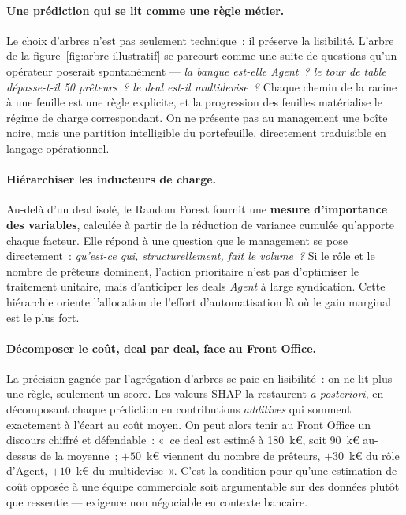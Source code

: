 \medskip
\paragraph{Une prédiction qui se lit comme une règle métier.}
Le choix d'arbres n'est pas seulement technique~: il préserve la lisibilité. L'arbre de la figure~\ref{fig:arbre-illustratif} se parcourt comme une suite de questions qu'un opérateur poserait spontanément --- \textit{la banque est-elle Agent~? le tour de table dépasse-t-il 50 prêteurs~? le deal est-il multidevise~?} Chaque chemin de la racine à une feuille est une règle explicite, et la progression des feuilles matérialise le régime de charge correspondant. On ne présente pas au management une boîte noire, mais une partition intelligible du portefeuille, directement traduisible en langage opérationnel.

\medskip
\paragraph{Hiérarchiser les inducteurs de charge.}
Au-delà d'un deal isolé, le Random Forest fournit une \textbf{mesure d'importance des variables}, calculée à partir de la réduction de variance cumulée qu'apporte chaque facteur. Elle répond à une question que le management se pose directement~: \emph{qu'est-ce qui, structurellement, fait le volume~?} Si le rôle et le nombre de prêteurs dominent, l'action prioritaire n'est pas d'optimiser le traitement unitaire, mais d'anticiper les deals \textit{Agent} à large syndication. Cette hiérarchie oriente l'allocation de l'effort d'automatisation là où le gain marginal est le plus fort.

\medskip
\paragraph{Décomposer le coût, deal par deal, face au Front Office.}
La précision gagnée par l'agrégation d'arbres se paie en lisibilité~: on ne lit plus une règle, seulement un score. Les valeurs SHAP la restaurent \emph{a posteriori}, en décomposant chaque prédiction en contributions \emph{additives} qui somment exactement à l'écart au coût moyen. On peut alors tenir au Front Office un discours chiffré et défendable~: «~ce deal est estimé à 180~k€, soit 90~k€ au-dessus de la moyenne~; $+50$~k€ viennent du nombre de prêteurs, $+30$~k€ du rôle d'Agent, $+10$~k€ du multidevise~». C'est la condition pour qu'une estimation de coût opposée à une équipe commerciale soit argumentable sur des données plutôt que ressentie --- exigence non négociable en contexte bancaire.


